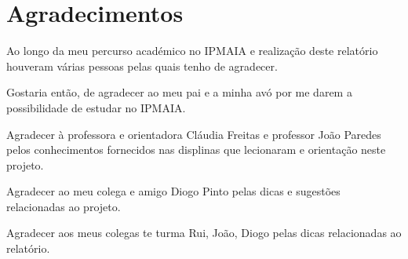 \chapter*{Agradecimentos}


Ao longo da meu percurso académico no IPMAIA e realização deste relatório houveram várias pessoas
pelas quais tenho de agradecer.

Gostaria então, de agradecer ao meu pai e a minha avó por me darem a possibilidade de 
estudar no IPMAIA.

Agradecer à professora e orientadora Cláudia Freitas e professor 
João Paredes pelos conhecimentos fornecidos nas displinas que lecionaram e orientação
neste projeto. 

Agradecer ao meu colega e amigo Diogo Pinto pelas dicas e sugestões relacionadas 
ao projeto.

Agradecer aos meus colegas te turma Rui, João, Diogo pelas dicas relacionadas ao
relatório.
